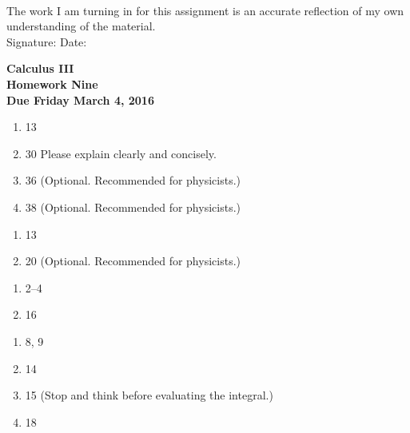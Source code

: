 \documentclass[12pt]{article}
\begin{document}
\\

\bigskip
\bigskip
\bigskip
\bigskip
\bigskip
\bigskip
\noindent The work I am turning in for this assignment is an accurate
reflection of my own understanding of the material.\\[14pt]

\noindent Signature: \underline{\hspace{7cm}} \hspace{1cm} Date:
\underline{\hspace{5cm}} 


\pagestyle{empty}
 
\begin{center}
{\large {\bf Calculus III}}\\
\medskip
{\large {\bf Homework Nine}}\\
\medskip
{ {\bf Due Friday March 4, 2016}}\\
\end{center}


\bigskip


\begin{enumerate}
\setlength{\itemsep}{-1mm}
  \item 13
  \item 30 Please explain clearly and concisely.
  \item 36 (Optional.  Recommended for physicists.)
  \item 38 (Optional.  Recommended for physicists.)
\end{enumerate}



\begin{enumerate}
\setlength{\itemsep}{-1mm}
  \item 13
  \item 20 (Optional.  Recommended for physicists.)
\end{enumerate}


\begin{enumerate}
\setlength{\itemsep}{-1mm}
  \item 2--4
  \item 16
\end{enumerate}

\begin{enumerate}
\setlength{\itemsep}{-1mm}
  \item 8, 9
  \item 14
  \item 15 (Stop and think before evaluating the integral.)
  \item 18
\end{enumerate}
\end{document}
